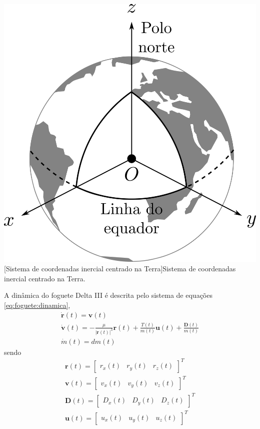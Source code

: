 \noindent	
\begin{minipage}{\textwidth}
	\vspace{\onelineskip}
	\centering
	\includegraphics[width=0.65\linewidth]{draw/resultados/pdf/coordenadasECI}
	[Sistema de coordenadas inercial centrado na Terra]{Sistema de coordenadas inercial centrado na Terra.}
	\label{fig:foguete:eci}
	\vspace{\onelineskip}
\end{minipage}


A dinâmica do foguete Delta III é descrita pelo sistema de equações \eqref{eq:foguete:dinamica},
%
\begin{equation}
	\label{eq:foguete:dinamica}
	\begin{gathered}
		\dot{\mathbf{r}}(t) = \mathbf{v}(t) \\
		\dot{\mathbf{v}}(t) = -\frac{\mu}{|\mathbf{r}(t)|^3} \mathbf{r}(t) + \frac{T(t)}{m(t)} \mathbf{u}(t) + \frac{\mathbf{D}(t)}{m(t)} \\
		\dot{m}(t) = dm(t)
	\end{gathered}
\end{equation}
%
sendo
%
\begin{equation}
	\begin{gathered}
		\mathbf{r}(t) = \begin{bmatrix} r_x(t) & r_y(t) & r_z(t) \end{bmatrix}^T \\
		\mathbf{v}(t) = \begin{bmatrix} v_x(t) & v_y(t) & v_z(t) \end{bmatrix}^T \\
		\mathbf{D}(t) = \begin{bmatrix} D_x(t) & D_y(t) & D_z(t) \end{bmatrix}^T \\
		\mathbf{u}(t) = \begin{bmatrix} u_x(t) & u_y(t) & u_z(t) \end{bmatrix}^T 
	\end{gathered}
\end{equation}

